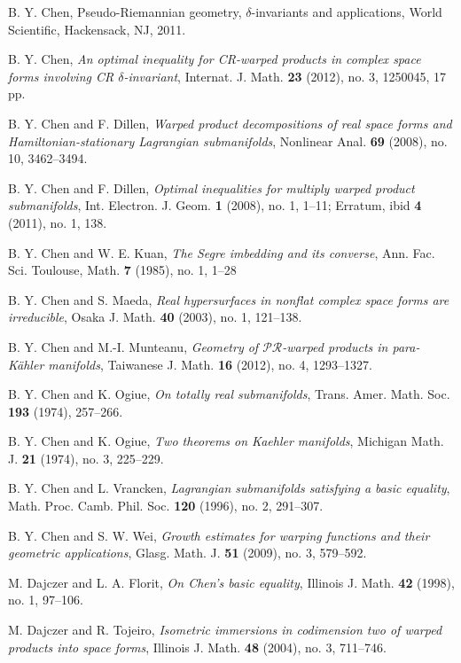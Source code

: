 \documentclass{amsart}
\theoremstyle{plain}
\numberwithin{equation}{section}
\theoremstyle{remark}
\numberwithin{equation}{section}
\begin{document}
\begin{thebibliography}{120}
 B. Y. Chen, Pseudo-Riemannian geometry, $\delta$-invariants and applications, World Scientific,  Hackensack, NJ, 2011.

 B. Y. Chen, {\it An optimal inequality for CR-warped products in complex space forms involving CR $\delta$-invariant},  Internat. J. Math. {\bf 23} (2012), no. 3, 1250045, 17 pp.

 B. Y. Chen and F. Dillen, {\it Warped product decompositions of real space forms and Hamil\-tonian-stationary Lagrangian submanifolds}, Nonlinear Anal. {\bf 69} (2008), no. 10, 3462--3494.

 B. Y. Chen and F. Dillen, {\it  Optimal inequalities for multiply warped product submanifolds}, Int. Electron. J. Geom. {\bf 1} (2008), no. 1, 1--11; Erratum, ibid {\bf 4} (2011), no. 1, 138.

 B. Y. Chen and W. E. Kuan,  {\em The Segre imbedding and its converse}, Ann. Fac. Sci. Toulouse, Math. {\bf 7} (1985), no. 1, 1--28

 B. Y. Chen and S. Maeda,  {\em  Real hypersurfaces in nonflat complex space forms are irreducible},  Osaka J. Math. {\bf 40} (2003), no. 1, 121--138. 

 B. Y. Chen and M.-I.  Munteanu, {\it Geometry of $\mathcal{PR}$-warped products in para-K\"ahler manifolds},  Taiwanese J. Math. {\bf 16} (2012), no. 4, 1293--1327. 

 B. Y. Chen and K. Ogiue,  {\it On totally real submanifolds}, Trans. Amer. Math. Soc. {\bf 193} (1974), 257--266.

 B. Y. Chen and K. Ogiue,  {\it Two theorems on Kaehler manifolds}, Michigan Math. J. {\bf 21} (1974), no. 3, 225--229.

 B. Y. Chen and L. Vrancken, {\it  Lagrangian submanifolds satisfying a basic equality}, { Math. Proc. Camb. Phil. Soc.} {\bf 120} (1996), no. 2, 291--307.

  B. Y. Chen and S. W. Wei, {\it Growth estimates for warping functions and their geometric applications}, Glasg. Math. J. {\bf 51} (2009), no. 3, 579--592.

 M. Dajczer and L. A. Florit, {\em  On Chen's basic equality},  Illinois J. Math. {\bf 42} (1998), no. 1, 97--106. 

 M. Dajczer and R. Tojeiro, {\it  Isometric immersions in codimension two of warped products into space forms}, Illinois J. Math. {\bf 48} (2004), no. 3, 711--746.


\end{thebibliography}
\end{document}
